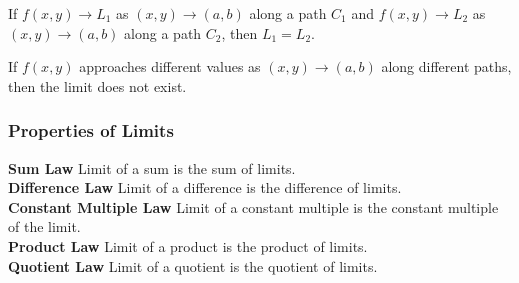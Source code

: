 \begin{theorem}
  If \(f(x, y) \to L_1\) as \((x, y) \to (a, b)\) along a path \(C_1\) and \(f(x, y) \to L_2\) as \((x, y) \to (a, b)\) along a path \(C_2\), then \(L_1 = L_2\).
\end{theorem}

\begin{corollary}
  If \(f(x, y)\) approaches different values as \((x, y) \to (a, b)\) along different paths, then the limit does not exist.
\end{corollary}


\subsubsection{Properties of Limits}

\textbf{Sum Law} Limit of a sum is the sum of limits. \\
\textbf{Difference Law} Limit of a difference is the difference of limits. \\
\textbf{Constant Multiple Law} Limit of a constant multiple is the constant multiple of the limit. \\
\textbf{Product Law} Limit of a product is the product of limits. \\
\textbf{Quotient Law} Limit of a quotient is the quotient of limits. \\

